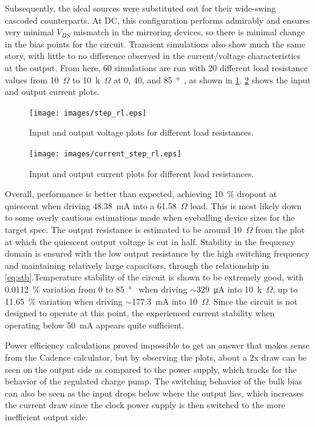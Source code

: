 \documentclass[11pt,letterpaper]{article}
\providecommand*{\upOmega}{\varOmega}   %
\begin{document}
Subsequently, the ideal sources were substituted out for their wide-swing cascoded counterparts. At DC, this configuration performs admirably and ensures very minimal \(V_{DS}\) mismatch in the mirroring devices, so there is minimal change in the bias points for the circuit. Transient simulations also show much the same story, with little to no difference observed in the current/voltage characteristics at the output. From here, 60 simulations are run with 20 different load resistance values from \qty{10}{\(\upOmega\)} to \qty{10}{k\(\upOmega\)} at 0, 40, and \qty{85}{\degree\C}, as shown in \cref{fig:voltage_step}. \cref{fig:current_step} shows the input and output current plots.

\begin{figure}
    \centering
    \texttt{[image: images/step\_rl.eps]}
    \caption{Input and output voltage plots for different load resistances.}
    \label{fig:voltage_step}
\end{figure}

\begin{figure}
    \centering
    \texttt{[image: images/current\_step\_rl.eps]}
    \caption{Input and output current plots for different load resistances.}
    \label{fig:current_step}
\end{figure}

Overall, performance is better than expected, achieving \qty{10}{\%} dropout at quiescent when driving \qty{48.38}{\mA} into a \qty{61.58}{\(\upOmega\)} load. This is most likely down to some overly cautious estimations made when eyeballing device sizes for the target spec. The output resistance is estimated to be around \qty{10}{\(\upOmega\)} from the plot at which the quiescent output voltage is cut in half. Stability in the frequency domain is ensured with the low output resistance by the high switching frequency and maintaining relatively large capacitors, through the relationship in \cref{eq:stb}.Temperature stability of the circuit is shown to be extremely good, with \qty{0.0112}{\%} variation from 0 to \qty{85}{\degree\C} when driving \(\sim\)\qty{329}{\uA} into \qty{10}{k\(\upOmega\)}, up to \qty{11.65}{\%} variation when driving \(\sim\)\qty{177.3}{\mA} into \qty{10}{\(\upOmega\)}. Since the circuit is not designed to operate at this point, the experienced current stability when operating below \qty{50}{\mA} appears quite sufficient.

Power efficiency calculations proved impossible to get an answer that makes sense from the Cadence calculator, but by observing the plots, about a 2x draw can be seen on the output side as compared to the power supply, which tracks for the behavior of the regulated charge pump. The switching behavior of the bulk bias can also be seen as the input drops below where the output lies, which increases the current draw since the clock power supply is then switched to the more inefficient output side.
\end{document}
